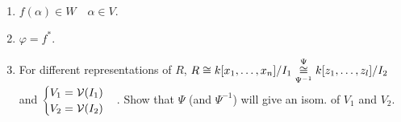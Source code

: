 \begin{exercise} \mbox{}
  \begin{enumerate}
    \item $f(\alpha) \in W \quad \alpha \in V$.
    \item $\varphi = f^*$.
    \item For different representations of $R$,
      $R \cong {k[x_1, \dots, x_n]}/{I_1} \underset{\Psi^{-1}}{\overset{\Psi}{\cong}}
      {k[z_1, \dots, z_l]}/{I_2}$
      and $\begin{cases}V_1 = \mathcal{V}(I_1) \\ V_2 = \mathcal{V}(I_2) \end{cases}$.
      Show that $\Psi$ (and $\Psi^{-1}$) will give an isom. of $V_1$ and $V_2$.
  \end{enumerate}
\end{exercise}

